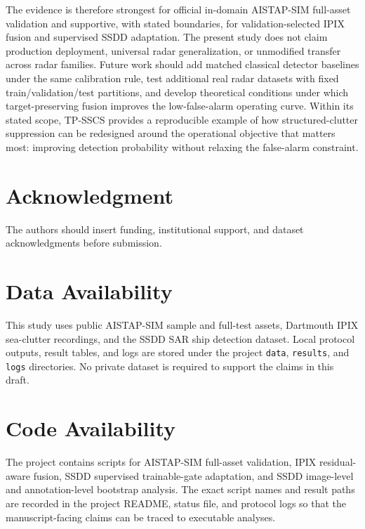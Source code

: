 \documentclass[journal]{IEEEtran}
\begin{document}
The evidence is therefore strongest for official in-domain AISTAP-SIM full-asset validation and supportive, with stated boundaries, for validation-selected IPIX fusion and supervised SSDD adaptation. The present study does not claim production deployment, universal radar generalization, or unmodified transfer across radar families. Future work should add matched classical detector baselines under the same calibration rule, test additional real radar datasets with fixed train/validation/test partitions, and develop theoretical conditions under which target-preserving fusion improves the low-false-alarm operating curve. Within its stated scope, TP-SSCS provides a reproducible example of how structured-clutter suppression can be redesigned around the operational objective that matters most: improving detection probability without relaxing the false-alarm constraint.

\section*{Acknowledgment}

The authors should insert funding, institutional support, and dataset acknowledgments before submission.

\section*{Data Availability}

This study uses public AISTAP-SIM sample and full-test assets, Dartmouth IPIX sea-clutter recordings, and the SSDD SAR ship detection dataset. Local protocol outputs, result tables, and logs are stored under the project \texttt{data}, \texttt{results}, and \texttt{logs} directories. No private dataset is required to support the claims in this draft.

\section*{Code Availability}

The project contains scripts for AISTAP-SIM full-asset validation, IPIX residual-aware fusion, SSDD supervised trainable-gate adaptation, and SSDD image-level and annotation-level bootstrap analysis. The exact script names and result paths are recorded in the project README, status file, and protocol logs so that the manuscript-facing claims can be traced to executable analyses.
\end{document}
